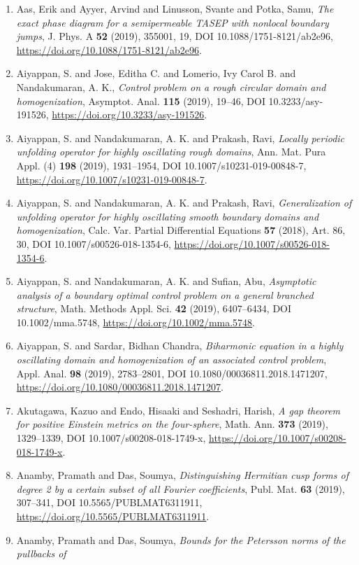 \begin{enumerate}
\item Aas, Erik and Ayyer, Arvind and Linusson, Svante and Potka,
Samu, {\em The exact phase diagram for a semipermeable {TASEP} with
nonlocal boundary jumps}, J. Phys. A {\bf 52} (2019), 355001, 19, DOI 10.1088/1751-8121/ab2e96, \url{https://doi.org/10.1088/1751-8121/ab2e96}.
\item Aiyappan, S. and Jose, Editha C. and Lomerio, Ivy Carol B. and
Nandakumaran, A. K., {\em Control problem on a rough circular domain and homogenization}, Asymptot. Anal. {\bf 115} (2019), 19--46, DOI 10.3233/asy-191526, \url{https://doi.org/10.3233/asy-191526}.
\item Aiyappan, S. and Nandakumaran, A. K. and Prakash, Ravi, {\em Locally periodic unfolding operator for highly oscillating
rough domains}, Ann. Mat. Pura Appl. (4) {\bf 198} (2019), 1931--1954, DOI 10.1007/s10231-019-00848-7, \url{https://doi.org/10.1007/s10231-019-00848-7}.
\item Aiyappan, S. and Nandakumaran, A. K. and Prakash, Ravi, {\em Generalization of unfolding operator for highly oscillating
smooth boundary domains and homogenization}, Calc. Var. Partial Differential Equations {\bf 57} (2018), Art. 86, 30, DOI 10.1007/s00526-018-1354-6, \url{https://doi.org/10.1007/s00526-018-1354-6}.
\item Aiyappan, S. and Nandakumaran, A. K. and Sufian, Abu, {\em Asymptotic analysis of a boundary optimal control problem on a
general branched structure}, Math. Methods Appl. Sci. {\bf 42} (2019), 6407--6434, DOI 10.1002/mma.5748, \url{https://doi.org/10.1002/mma.5748}.
\item Aiyappan, S. and Sardar, Bidhan Chandra, {\em Biharmonic equation in a highly oscillating domain and
homogenization of an associated control problem}, Appl. Anal. {\bf 98} (2019), 2783--2801, DOI 10.1080/00036811.2018.1471207, \url{https://doi.org/10.1080/00036811.2018.1471207}.
\item Akutagawa, Kazuo and Endo, Hisaaki and Seshadri, Harish, {\em A gap theorem for positive {E}instein metrics on the
four-sphere}, Math. Ann. {\bf 373} (2019), 1329--1339, DOI 10.1007/s00208-018-1749-x, \url{https://doi.org/10.1007/s00208-018-1749-x}.
\item Anamby, Pramath and Das, Soumya, {\em Distinguishing {H}ermitian cusp forms of degree 2 by a certain
subset of all {F}ourier coefficients}, Publ. Mat. {\bf 63} (2019), 307--341, DOI 10.5565/PUBLMAT6311911, \url{https://doi.org/10.5565/PUBLMAT6311911}.
\item Anamby, Pramath and Das, Soumya, {\em Bounds for the {P}etersson norms of the pullbacks of
}
\end{enumerate}
